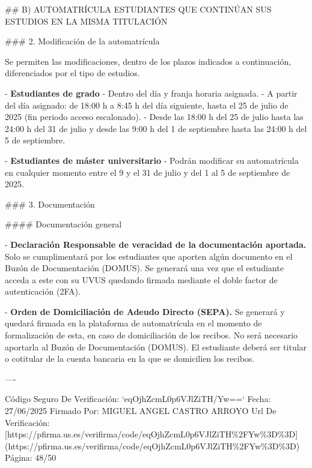 \documentclass{article}
\begin{document}
\begin{itemize}
\begin{itemize}
\begin{scriptsize}
                  \#\# B) AUTOMATRÍCULA ESTUDIANTES QUE CONTINÚAN SUS ESTUDIOS EN LA MISMA TITULACIÓN

                  \#\#\# 2. Modificación de la automatrícula

                  Se permiten las modificaciones, dentro de los plazos indicados a continuación, diferenciados por el tipo de estudios.

                  - \textbf{Estudiantes de grado}
                  - Dentro del día y franja horaria asignada.
                  - A partir del día asignado: de 18:00 h a 8:45 h del día siguiente, hasta el 25 de julio de 2025 (fin periodo acceso escalonado).
                  - Desde las 18:00 h del 25 de julio hasta las 24:00 h del 31 de julio y desde las 9:00 h del 1 de septiembre hasta las 24:00 h del 5 de septiembre.

                  - \textbf{Estudiantes de máster universitario}
                  - Podrán modificar su automatrícula en cualquier momento entre el 9 y el 31 de julio y del 1 al 5 de septiembre de 2025.

                  \#\#\# 3. Documentación

                  \#\#\#\# Documentación general

                  - \textbf{Declaración Responsable de veracidad de la documentación aportada.} Solo se cumplimentará por los estudiantes que aporten algún documento en el Buzón de Documentación (DOMUS). Se generará una vez que el estudiante acceda a este con su UVUS quedando firmada mediante el doble factor de autenticación (2FA).

                  - \textbf{Orden de Domiciliación de Adeudo Directo (SEPA).} Se generará y quedará firmada en la plataforma de automatrícula en el momento de formalización de esta, en caso de domiciliación de los recibos. No será necesario aportarla al Buzón de Documentación (DOMUS). El estudiante deberá ser titular o cotitular de la cuenta bancaria en la que se domicilien los recibos.

                  ----

                  Código Seguro De Verificación: `eqOjhZcmL0p6VJlZiTH/Yw==`
                  Fecha: 27/06/2025
                  Firmado Por: MIGUEL ANGEL CASTRO ARROYO
                  Url De Verificación: [https://pfirma.us.es/verifirma/code/eqOjhZcmL0p6VJlZiTH\%2FYw\%3D\%3D](https://pfirma.us.es/verifirma/code/eqOjhZcmL0p6VJlZiTH\%2FYw\%3D\%3D)
                  Página: 48/50


\end{scriptsize}
\end{itemize}
\end{itemize}
\end{document}
